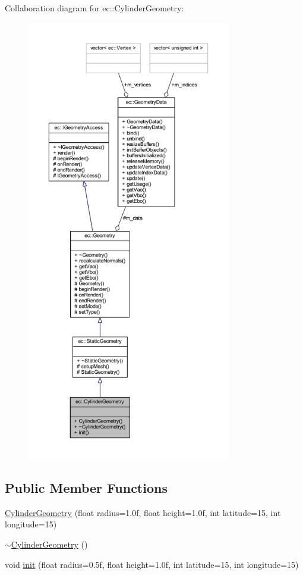 Collaboration diagram for ec\+:\+:Cylinder\+Geometry\+:\nopagebreak
\begin{figure}[H]
\begin{center}
\leavevmode
\includegraphics[height=550pt]{classec_1_1_cylinder_geometry__coll__graph}
\end{center}
\end{figure}
\subsection*{Public Member Functions}
\begin{DoxyCompactItemize}
\item 
\mbox{\hyperlink{classec_1_1_cylinder_geometry_aa2618ccddd34ee5eb20acc43a41626bf}{Cylinder\+Geometry}} (float radius=1.\+0f, float height=1.\+0f, int latitude=15, int longitude=15)
\item 
\mbox{\hyperlink{classec_1_1_cylinder_geometry_a8f162e4c81e60abb62cc0bf42cab7ed6}{$\sim$\+Cylinder\+Geometry}} ()
\item 
void \mbox{\hyperlink{classec_1_1_cylinder_geometry_a099fbcb7e2fbbaec506ccc115ad90ffc}{init}} (float radius=0.\+5f, float height=1.\+0f, int latitude=15, int longitude=15)
\end{DoxyCompactItemize}
